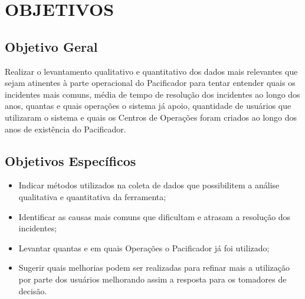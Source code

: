 % 
%


\chapter{OBJETIVOS}
\label{chap:objetivos}

\section{Objetivo Geral}
\label{sec:objetivogeral}

Realizar o levantamento qualitativo e quantitativo dos dados mais relevantes que sejam atinentes à parte operacional do Pacificador para tentar entender quais os incidentes mais comuns, média de tempo de resolução dos incidentes ao longo dos anos, quantas e quais operações o sistema já apoio, quantidade de usuários que utilizaram o sistema e quais os Centros de Operações foram criados ao longo dos anos de existência do Pacificador.

\section{Objetivos Específicos}
\label{sec:objetivosespecificos}

\begin{itemize}
    \item Indicar métodos utilizados na coleta de dados que possibilitem a análise qualitativa e quantitativa  da ferramenta;
    \item Identificar as causas mais comuns que dificultam e atrasam a resolução dos incidentes;
    \item Levantar quantas e em quais Operações o Pacificador já foi utilizado;
    \item Sugerir quais melhorias podem ser realizadas para refinar mais a utilização por parte dos usuários melhorando assim a resposta para os tomadores de decisão.
\end{itemize}